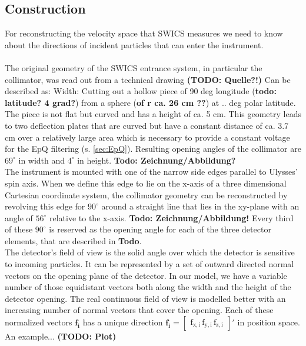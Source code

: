 \subsection{Construction} \label{subsec:construction}
For reconstructing the velocity space that SWICS measures we need to know about the directions of incident particles that can enter the instrument.
\\ \\
The original geometry of the SWICS entrance system, in particular the collimator, was read out from a technical drawing \textbf{\textbf{(TODO: Quelle?!})}
Can be described as:
Width: Cutting out a hollow piece of 90 deg longitude (\textbf{todo: latitude? 4 grad?}) from a sphere (\textbf{of r ca. 26 cm ??}) at .. deg polar latitude. The piece is not flat but curved and has a height of ca. 5 cm. This geometry leads to two deflection plates that are curved but have a constant distance of ca. 3.7 cm over a relatively large area which is necessary to provide a constant voltage for the EpQ filtering (s. \ref{sec:EpQ}). Resulting opening angles of the collimator are $69^\circ$ in width and $4^\circ$ in height. \textbf{Todo: Zeichnung/Abbildung?}\\
The instrument is mounted with one of the narrow side edges parallel to Ulysses' spin axis. When we define this edge to lie on the x-axis of a three dimensional Cartesian coordinate system, the collimator geometry can be reconstructed by revolving this edge for $90^\circ$ around a straight line that lies in the xy-plane with an angle of $56^\circ$ relative to the x-axis. \textbf{Todo: Zeichnung/Abbildung!} Every third of these $90^\circ$ is reserved as the opening angle for each of the three detector elements, that are described in \textbf{Todo}.  \\
The detector's field of view is the solid angle over which the detector is sensitive to incoming particles.
It can be represented by a set of outward directed normal vectors on the opening plane of the detector. In our model, we have a variable number of those equidistant vectors both along the width and the height of the detector opening. The real continuous field of view is modelled better with an increasing number of normal vectors that cover the opening. Each of these normalized vectors $\mathrm{\mathbf{f_i}}$ has a unique direction $\mathrm{\mathbf{f_i} = \begin{bmatrix}f_{x,i}\,f_{y,i}\,f_{z,i}\end{bmatrix}}'$ in position space. An example... \textbf{(TODO: Plot)}
\\
